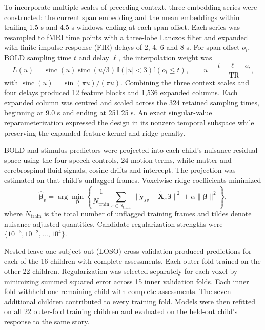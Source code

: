 To incorporate multiple scales of preceding context, three embedding series were constructed: the current span embedding and the mean embeddings within trailing 1.5-s and 4.5-s windows ending at each span offset. Each series was resampled to fMRI time points with a three-lobe Lanczos filter and expanded with finite impulse response (FIR) delays of 2, 4, 6 and 8 s. For span offset $o_i$, BOLD sampling time $t$ and delay $\ell$, the interpolation weight was
\begin{equation}
 L(u)=\operatorname{sinc}(u)\operatorname{sinc}(u/3)\,
       \mathbb{I}(|u|<3)\mathbb{I}(o_i\leq t),
 \qquad u=\frac{t-\ell-o_i}{\mathrm{TR}},
\end{equation}
with $\operatorname{sinc}(u)=\sin(\pi u)/(\pi u)$. Combining the three context scales and four delays produced 12 feature blocks and 1,536 expanded columns. Each expanded column was centred and scaled across the 324 retained sampling times, beginning at 9.0 s and ending at 251.25 s. An exact singular-value reparameterization expressed the design in its nonzero temporal subspace while preserving the expanded feature kernel and ridge penalty.

BOLD and stimulus predictors were projected into each child's nuisance-residual space using the four speech controls, 24 motion terms, white-matter and cerebrospinal-fluid signals, cosine drifts and intercept. The projection was estimated on that child's unflagged frames. Voxelwise ridge coefficients minimized
\begin{equation}
 \widehat{\boldsymbol{\beta}}_v
 =\arg\min_{\boldsymbol{\beta}}
 \left\{\frac{1}{N_{\mathrm{train}}}
 \sum_{s\in\mathcal{S}_{\mathrm{train}}}
 \|\widetilde{\mathbf y}_{sv}-\widetilde{\mathbf X}_s\boldsymbol{\beta}\|^2
 +\alpha\|\boldsymbol{\beta}\|^2\right\},
\end{equation}
where $N_{\mathrm{train}}$ is the total number of unflagged training frames and tildes denote nuisance-adjusted quantities. Candidate regularization strengths were $\{10^{-3},10^{-2},\ldots,10^{4}\}$.

Nested leave-one-subject-out (LOSO) cross-validation produced predictions for each of the 16 children with complete assessments. Each outer fold trained on the other 22 children. Regularization was selected separately for each voxel by minimizing summed squared error across 15 inner validation folds. Each inner fold withheld one remaining child with complete assessments. The seven additional children contributed to every training fold. Models were then refitted on all 22 outer-fold training children and evaluated on the held-out child's response to the same story.


